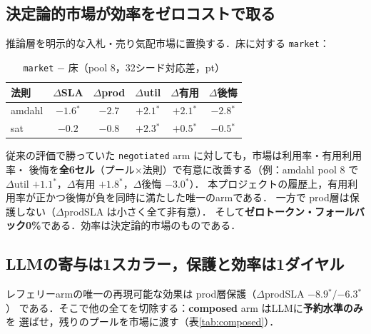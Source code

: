 \documentclass[uplatex,twocolumn,fontsize=9pt,paper=a4]{jlreq}
\newcommand{\sig}{$^{*}$}
\begin{document}
\subsection{決定論的市場が効率をゼロコストで取る}\label{sec:market}
推論層を明示的な入札・売り気配市場に置換する．床に対する \texttt{market}：

\begin{table}[t]
\centering\small
\caption{\texttt{market} $-$ 床（pool 8，32シード対応差，pt）}
\label{tab:market}
\begin{tabular}{lccccc}
\toprule
法則 & $\Delta$SLA & $\Delta$prod & $\Delta$util & $\Delta$有用 & $\Delta$後悔 \\
\midrule
amdahl & $-1.6$\sig & $-2.7$ & $+2.1$\sig & $+2.1$\sig & $-2.8$\sig \\
sat    & $-0.2$     & $-0.8$ & $+2.3$\sig & $+0.5$\sig & $-0.5$\sig \\
\bottomrule
\end{tabular}
\end{table}

従来の評価で勝っていた \texttt{negotiated} arm に対しても，市場は利用率・有用利用率・
後悔を\textbf{全6セル}（プール$\times$法則）で有意に改善する（例：amdahl pool 8 で
$\Delta$util $+1.1$\sig，$\Delta$有用 $+1.8$\sig，$\Delta$後悔 $-3.0$\sig）．
本プロジェクトの履歴上，有用利用率が正かつ後悔が負を同時に満たした唯一のarmである．
一方で prod層は保護しない（$\Delta$prodSLA は小さく全て非有意）．
そして\textbf{ゼロトークン・フォールバック0\%}である．効率は決定論的市場のものである．

\subsection{LLMの寄与は1スカラー，保護と効率は1ダイヤル}\label{sec:scalar}
レフェリーarmの唯一の再現可能な効果は prod層保護（$\Delta$prodSLA $-8.9$\sig/$-6.3$\sig）
である．そこで他の全てを切除する：\textbf{composed} arm はLLMに\textbf{予約水準のみ}を
選ばせ，残りのプールを市場に渡す（表\ref{tab:composed}）．
\end{document}

